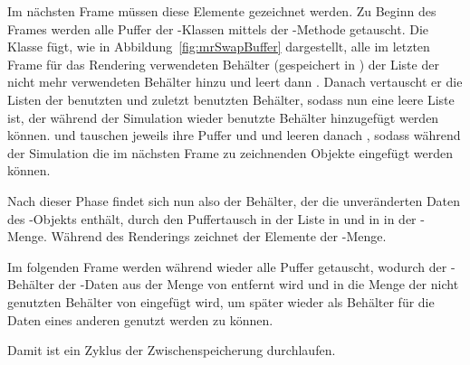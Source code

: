 Im nächsten Frame müssen diese Elemente gezeichnet werden. Zu Beginn des Frames werden alle Puffer der -Klassen mittels der -Methode getauscht. Die Klasse  fügt, wie in Abbildung~\ref{fig:mrSwapBuffer} dargestellt, alle im letzten Frame für das Rendering verwendeten Behälter (gespeichert in ) der Liste der nicht mehr verwendeten Behälter hinzu und leert dann . Danach vertauscht er die Listen der benutzten und zuletzt benutzten Behälter, sodass  nun eine leere Liste ist, der während der Simulation wieder benutzte Behälter hinzugefügt werden können.  und  tauschen jeweils ihre Puffer  und  und leeren danach , sodass während der Simulation die im nächsten Frame zu zeichnenden Objekte eingefügt werden können.

\begin{leftrule}
	Nach dieser Phase findet sich nun also der Behälter, der die unveränderten Daten des -Objekts enthält, durch den Puffertausch in der Liste  in  und in  in der -Menge. Während des Renderings zeichnet der  Elemente der -Menge.
	
	Im folgenden Frame werden während  wieder alle Puffer getauscht, wodurch der -Behälter der -Daten aus der Menge von  entfernt wird und in die Menge der nicht genutzten Behälter von  eingefügt wird, um später wieder als Behälter für die Daten eines anderen  genutzt werden zu können. 
\end{leftrule}

Damit ist ein Zyklus der Zwischenspeicherung durchlaufen. 

